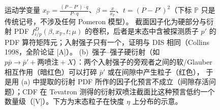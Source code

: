 \begin{figure}[htbp]
{运动学变量 $x_{\mathbb P}=\frac{(P-P')\cdot q}{P\cdot q}$、$\beta=\frac{x}{x_{\mathbb P}}$、$t=(P-P')^2$（下标 $\mathbb P$ 只是传统记号，不涉及任何 Pomeron 模型）。
截面因子化为硬部分与衍射 PDF $f^{D}_{i/p}(\beta,x_{\mathbb P},t;\mu)$ 的卷积，后者是末态中含被探测质子 $p'$ 的 PDF 算符矩阵元；入射强子只有一个，证明与 DIS 相同（Collins 1998，全阶论证 [A]）。
(b)~强子--强子硬衍射（如 $p\bar p\to\bar p'+\text{两喷注}+X$）：两个入射强子的旁观者之间的软/Glauber 相互作用（暗红色）可以打碎 $\bar p'$ 或在间隙中产生粒子（红色），
于是用 (a) 中提取的衍射 PDF 所作的因子化预言不成立（间隙存活问题）；CDF 在 Tevatron 测得的衍射双喷注截面比这种预言低约一个数量级（[V]）。下方为末态粒子在快度 $\eta$ 上分布的示意。}
\label{fig:diffraction}
\end{figure}
